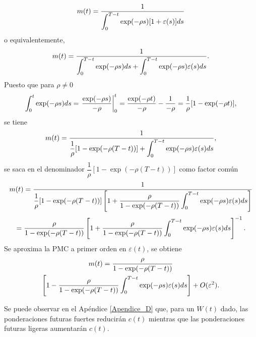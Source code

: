 \begin{equation}
\label{eq 38}
m(t)= \dfrac{1}{\displaystyle \int_0^{T-t} \exp (- \rho s) [1+ \varepsilon(s)] ds}    
\end{equation}
o equivalentemente,
$$m(t)= \dfrac{1}{\displaystyle \int_0^{T-t} \exp (- \rho s)  ds + \int_0^{T-t} \exp (- \rho s)  \varepsilon(s) ds} . $$
%
\noindent Puesto que para $\rho \neq 0$
%
\begin{equation}
\label{eq 39}
    \displaystyle \int_0^t \exp (- \rho s) ds = \left. \dfrac{\exp(-\rho s)}{-\rho} \right|^t_0 = \dfrac{\exp(-\rho t)}{-\rho} - \dfrac{1}{-\rho}=\dfrac{1}{\rho} [1 - \exp (- \rho t)],
\end{equation}
se tiene
$$m(t)=\dfrac{1}{\dfrac{1}{\rho} [1 - \exp (-\rho (T-t))]+\displaystyle \int_0^{T-t} \exp (- \rho s) \varepsilon(s) ds},   
$$
%
se saca en el denominador $\dfrac{1}{\rho} [1 - \exp (-\rho (T-t))]$ como factor común
$$m(t)=\dfrac{1}{\dfrac{1}{\rho} [1 - \exp (-\rho (T-t))]\left[1+\dfrac{\rho}{1- \exp(-\rho(T-t))}\displaystyle \int_0^{T-t} \exp (- \rho s) \varepsilon(s) ds\right]}    
$$
$$=\dfrac{\rho}{1 - \exp (-\rho (T-t))} \left[ 1 + \dfrac{\rho}{1 - \exp (-\rho (T-t))} \displaystyle \int_0^{T-t} \exp (- \rho s) \varepsilon(s) ds \right]^{-1} . 
 $$
%
\noindent Se aproxima la PMC a primer orden en $\varepsilon(t)$, se obtiene
%
\begin{multline}
\label{eq 40}
m(t)=\dfrac{\rho}{1 - \exp (-\rho (T-t))} \\ \left[ 1 - \dfrac{\rho}{1 - \exp (-\rho (T-t))}\displaystyle  \int_0^{T-t} \exp (- \rho s) \varepsilon(s) ds \right]+ O(\varepsilon^2).    
\end{multline}

\noindent Se puede observar en el Apéndice \ref{Apendice_D} que, para un $W(t)$ dado, las ponderaciones futuras fuertes reducirán $c(t)$ mientras que las ponderaciones futuras ligeras aumentarán $c(t)$. 

